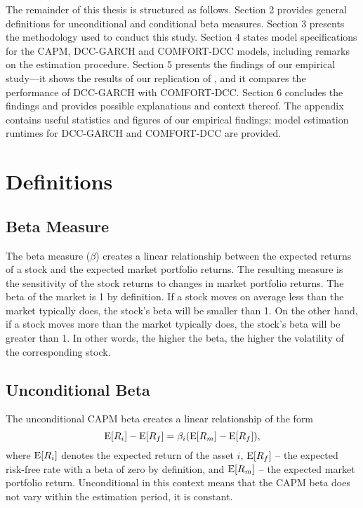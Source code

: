 \documentclass[11pt,a4paper]{article}
\begin{document}
The remainder of this thesis is structured as follows. Section 2 provides general definitions for unconditional and conditional beta measures. Section 3 presents the methodology used to conduct this study. Section 4 states model specifications for the CAPM, DCC-GARCH and COMFORT-DCC models, including remarks on the estimation procedure. Section 5 presents the findings of our empirical study---it shows the results of our replication of , and it compares the performance of DCC-GARCH with COMFORT-DCC. Section 6 concludes the findings and provides possible explanations and context thereof. The appendix contains useful statistics and figures of our empirical findings; model estimation runtimes for DCC-GARCH and COMFORT-DCC are provided.






\newpage
\section{Definitions}


\subsection{Beta Measure}

The beta measure ($\beta$) creates a linear relationship between the expected returns of a stock and the expected market portfolio returns. The resulting measure is the sensitivity of the stock returns to changes in market portfolio returns. The beta of the market is 1 by definition. If a stock moves on average less than the market typically does, the stock's beta will be smaller than 1. On the other hand, if a stock moves more than the market typically does, the stock's beta will be greater than 1. In other words, the higher the beta, the higher the volatility of the corresponding stock.

\subsection{Unconditional Beta} \label{unconditional_beta}

The unconditional CAPM beta creates a linear relationship of the form
\begin{equation}
    \textrm{E}[R_{i}] - \textrm{E}[ R_{f} ] = \beta_i ( \textrm{E}[ R_{m} ] - \textrm{E}[ R_{f} ] ),
\end{equation}
where $\textrm{E}[R_{i}]$ denotes the expected return of the asset $i$, $\textrm{E}[R_{f}]$ -- the expected risk-free rate with a beta of zero by definition, and $\textrm{E}[R_{m}]$ -- the expected market portfolio return. Unconditional in this context means that the CAPM beta does not vary within the estimation period, it is constant.
\end{document}
